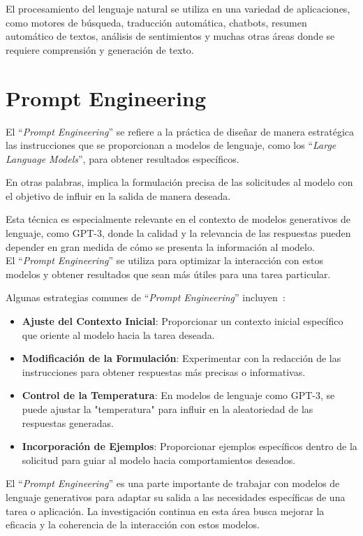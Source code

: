 El procesamiento del lenguaje natural se utiliza en una variedad de 
aplicaciones, como motores de búsqueda, traducción automática, chatbots, 
resumen automático de textos, análisis de sentimientos y 
muchas otras áreas donde se requiere comprensión y generación de texto.\\


\section{Prompt Engineering}
El ``\emph{Prompt Engineering}'' se refiere a la práctica de diseñar de manera
 estratégica las instrucciones que se proporcionan a modelos de lenguaje, 
 como los ``\emph{Large Language Models}'', para obtener resultados específicos. 

En otras palabras, implica la formulación precisa de las solicitudes al modelo 
con el objetivo de influir en la salida de manera deseada.

Esta técnica es especialmente relevante en el contexto de modelos 
generativos de lenguaje, como GPT-3, donde la calidad y la 
relevancia de las respuestas pueden depender en gran medida 
de cómo se presenta la información al modelo.\\
El ``\emph{Prompt Engineering}'' se utiliza para optimizar la interacción 
con estos modelos y obtener resultados que sean más útiles 
para una tarea particular.

Algunas estrategias comunes de ``\emph{Prompt Engineering}'' incluyen~\cite{white2023prompt}:
\begin{itemize}
	\item \textbf{Ajuste del Contexto Inicial}: Proporcionar un contexto inicial específico que oriente al modelo hacia la tarea deseada.
	\item \textbf{Modificación de la Formulación}: Experimentar con la redacción de las instrucciones para obtener respuestas más precisas o informativas.
	\item \textbf{Control de la Temperatura}: En modelos de lenguaje como GPT-3, se puede ajustar la "temperatura" para influir en la aleatoriedad de las respuestas generadas.
	\item \textbf{Incorporación de Ejemplos}: Proporcionar ejemplos específicos dentro de la solicitud para guiar al modelo hacia comportamientos deseados.
\end{itemize}
El ``\emph{Prompt Engineering}'' es una parte importante de trabajar con modelos de lenguaje generativos para adaptar su salida a las necesidades específicas de una tarea o aplicación. 
La investigación continua en esta área busca mejorar la eficacia y la coherencia de la interacción con estos modelos.


